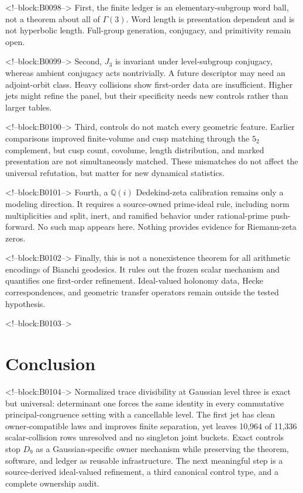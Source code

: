 \documentclass[11pt,a4paper]{article}
\theoremstyle{definition}
\theoremstyle{remark}
\begin{document}
<!--block:B0098-->
First, the finite ledger is an elementary-subgroup word ball, not a theorem about all of \(\Gamma(3)\). Word length is presentation dependent and is not hyperbolic length. Full-group generation, conjugacy, and primitivity remain open.

<!--block:B0099-->
Second, \(J_3\) is invariant under level-subgroup conjugacy, whereas ambient conjugacy acts nontrivially. A future descriptor may need an adjoint-orbit class. Heavy collisions show first-order data are insufficient. Higher jets might refine the panel, but their specificity needs new controls rather than larger tables.

<!--block:B0100-->
Third, controls do not match every geometric feature. Earlier comparisons improved finite-volume and cusp matching through the \(5_2\) complement, but cusp count, covolume, length distribution, and marked presentation are not simultaneously matched. These mismatches do not affect the universal refutation, but matter for new dynamical statistics.

<!--block:B0101-->
Fourth, a \(\mathbb Q(i)\) Dedekind-zeta calibration remains only a modeling direction. It requires a source-owned prime-ideal rule, including norm multiplicities and split, inert, and ramified behavior under rational-prime push-forward. No such map appears here. Nothing provides evidence for Riemann-zeta zeros.

<!--block:B0102-->
Finally, this is not a nonexistence theorem for all arithmetic encodings of Bianchi geodesics. It rules out the frozen scalar mechanism and quantifies one first-order refinement. Ideal-valued holonomy data, Hecke correspondences, and geometric transfer operators remain outside the tested hypothesis.

<!--block:B0103-->
\section{Conclusion}

<!--block:B0104-->
Normalized trace divisibility at Gaussian level three is exact but universal: determinant one forces the same identity in every commutative principal-congruence setting with a cancellable level. The first jet has clean owner-compatible laws and improves finite separation, yet leaves 10,964 of 11,336 scalar-collision rows unresolved and no singleton joint buckets. Exact controls stop \(D_9\) as a Gaussian-specific owner mechanism while preserving the theorem, software, and ledger as reusable infrastructure. The next meaningful step is a source-derived ideal-valued refinement, a third canonical control type, and a complete ownership audit.
\end{document}
